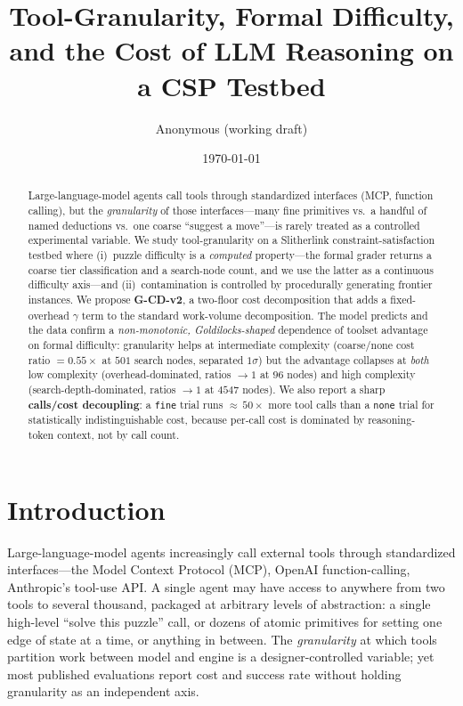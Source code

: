 \documentclass[11pt,letterpaper]{article}
\title{Tool-Granularity, Formal Difficulty, and the Cost of LLM
  Reasoning on a CSP Testbed}
\author{Anonymous (working draft)}
\date{\today}
\begin{document}
\maketitle

\begin{abstract}
Large-language-model agents call tools through standardized
interfaces (MCP, function calling), but the \emph{granularity} of
those interfaces---many fine primitives vs.\ a handful of named
deductions vs.\ one coarse ``suggest a move''---is rarely treated as
a controlled experimental variable. We study tool-granularity on a
Slitherlink constraint-satisfaction testbed where (i)~puzzle
difficulty is a \emph{computed} property---the formal grader
returns a coarse tier classification and a search-node count, and
we use the latter as a continuous difficulty axis---and
(ii)~contamination is controlled by procedurally generating frontier
instances. We propose \textbf{G-CD-v2}, a two-floor cost
decomposition that adds a fixed-overhead $\gamma$ term to the
standard work-volume decomposition. The model predicts and the data
confirm a \emph{non-monotonic, Goldilocks-shaped} dependence of
toolset advantage on formal difficulty: granularity helps at
intermediate complexity (coarse/none cost ratio $= 0.55\times$ at
$501$ search nodes, separated $1\sigma$) but the advantage collapses
at \emph{both} low complexity (overhead-dominated, ratios $\to 1$
at $96$ nodes) and high complexity (search-depth-dominated, ratios
$\to 1$ at $4547$ nodes). We also report a sharp \textbf{calls/cost
decoupling}: a \texttt{fine} trial runs ${\approx}\,50\times$ more
tool calls than a \texttt{none} trial for statistically
indistinguishable cost, because per-call cost is dominated by
reasoning-token context, not by call count.
\end{abstract}


\section{Introduction}
\label{sec:intro}

Large-language-model agents increasingly call external tools through
standardized interfaces---the Model Context Protocol (MCP), OpenAI
function-calling, Anthropic's tool-use API. A single agent may have
access to anywhere from two tools to several thousand, packaged at
arbitrary levels of abstraction: a single high-level ``solve this
puzzle'' call, or dozens of atomic primitives for setting one edge
of state at a time, or anything in between. The \emph{granularity}
at which tools partition work between model and engine is a
designer-controlled variable; yet most published evaluations report
cost and success rate without holding granularity as an independent
axis.
\end{document}

